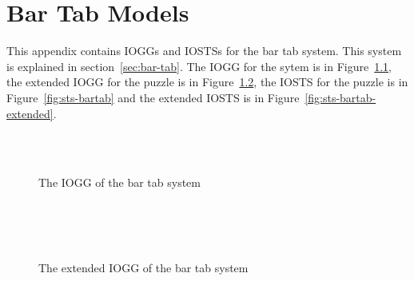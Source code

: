 \newpage
\chapter{Bar Tab Models}\label{app:bar-tab}
This appendix contains IOGGs and IOSTSs for the bar tab system. This system is explained in section~\ref{sec:bar-tab}. The IOGG for the sytem is in Figure~\ref{fig:gg-bartab}, the extended IOGG for the puzzle is in Figure~\ref{fig:gg-bartab-extended}, the IOSTS for the puzzle is in Figure~\ref{fig:sts-bartab} and the extended IOSTS is in Figure~\ref{fig:sts-bartab-extended}. 

  \begin{figure}[ht]
    \begin{center}
      \\
      \subfloat[?o (priority 0)]{\label{fig:order-tab}}\hspace{20px}
      \subfloat[!po (priority 1)]{\label{fig:process_order}}\\
      \subfloat[?p (priority 0)]{\label{fig:pay-tab}}\hspace{20px}
      \subfloat[!pp (priority 1)]{\label{fig:process_payment}}
    \end{center}
    \caption{The IOGG of the bar tab system}
    \label{fig:gg-bartab}
  \end{figure}

  \begin{figure}[ht]
    \begin{center}
      \hspace{20px}
      \subfloat[!pd (priority 1)]{\label{fig:process_discount}}\\
      \subfloat[?o (priority 1)]{\label{fig:order-tab-extended}}\hspace{20px}
      \subfloat[?d (priority 0)]{\label{fig:discount}}\\
      \subfloat[!po (priority 1)]{\label{fig:process_order-extended}}\\
    \end{center}
    \caption{The extended IOGG of the bar tab system}
    \label{fig:gg-bartab-extended}
  \end{figure}

